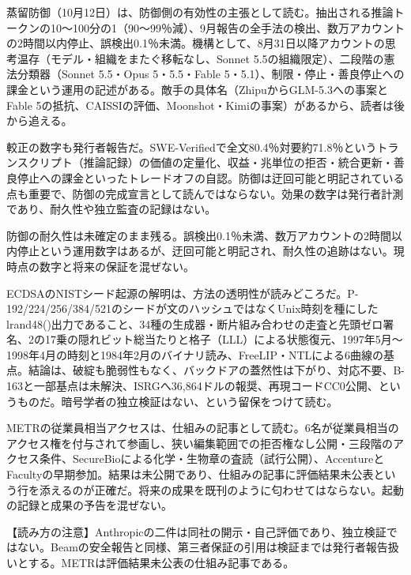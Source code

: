 \documentclass[lualatex,a4paper,10pt]{jlreq}
\begin{document}
蒸留防御（10月12日）は、防御側の有効性の主張として読む。抽出される推論トークンの10〜100分の1（90〜99％減）、9月報告の全手法の検出、数万アカウントの2時間以内停止、誤検出0.1％未満。機構として、8月31日以降アカウントの思考温存（モデル・組織をまたぐ移転なし、Sonnet 5.5の組織限定）、二段階の憲法分類器（Sonnet 5.5・Opus 5・5.5・Fable 5・5.1）、制限・停止・善良停止への課金という運用の記述がある。敵手の具体名（ZhipuからGLM-5.3への事案とFable 5の抵抗、CAISSIの評価、Moonshot・Kimiの事案）があるから、読者は後から追える。
\cite{B41}


較正の数字も発行者報告だ。SWE-Verifiedで全文80.4％対要約71.8％というトランスクリプト（推論記録）の価値の定量化、収益・兆単位の拒否・統合更新・善良停止への課金といったトレードオフの自認。防御は迂回可能と明記されている点も重要で、防御の完成宣言として読んではならない。効果の数字は発行者計測であり、耐久性や独立監査の記録はない。
\cite{B41}


防御の耐久性は未確定のまま残る。誤検出0.1％未満、数万アカウントの2時間以内停止という運用数字はあるが、迂回可能と明記され、耐久性の追跡はない。現時点の数字と将来の保証を混ぜない。
\cite{B41}


ECDSAのNISTシード起源の解明は、方法の透明性が読みどころだ。P-192/224/256/384/521のシードが文のハッシュではなくUnix時刻を種にしたlrand48()出力であること、34種の生成器・断片組み合わせの走査と先頭ゼロ署名、2の17乗の隠れビット総当たりと格子（LLL）による状態復元、1997年5月〜1998年4月の時刻と1984年2月のバイナリ読み、FreeLIP・NTLによる6曲線の基点。結論は、破綻も脆弱性もなく、バックドアの蓋然性は下がり、対応不要、B-163と一部基点は未解決、ISRGへ36,864ドルの報奨、再現コードCC0公開、というものだ。暗号学者の独立検証はない、という留保をつけて読む。
\cite{B42}


METRの従業員相当アクセスは、仕組みの記事として読む。6名が従業員相当のアクセス権を付与されて参画し、狭い編集範囲での拒否権なし公開・三段階のアクセス条件、SecureBioによる化学・生物章の査読（試行公開）、AccentureとFacultyの早期参加。結果は未公開であり、仕組みの記事に評価結果未公表という行を添えるのが正確だ。将来の成果を既刊のように匂わせてはならない。起動の記録と成果の予告を混ぜない。
\cite{B39}


\begin{tcolorbox}[colback=SurveySoft,colframe=SurveyRule,arc=1mm,boxrule=0.4pt,left=2mm,right=2mm]
【読み方の注意】Anthropicの二件は同社の開示・自己評価であり、独立検証ではない。Beamの安全報告と同様、第三者保証の引用は検証までは発行者報告扱いとする。METRは評価結果未公表の仕組み記事である。
\end{tcolorbox}
\cite{B39,B40,B41,B42}
\end{document}
